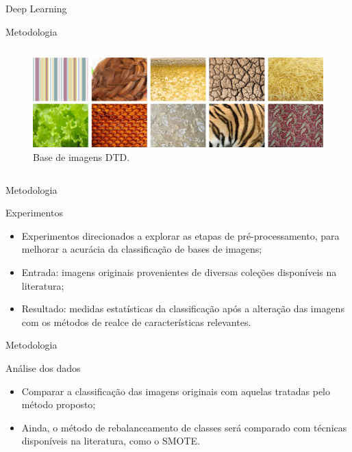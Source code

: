 \documentclass{beamer}
\begin{document}
\begin{frame}{Deep Learning}
\begin{frame}{Metodologia}
\begin{columns}
\begin{column}{0.5\textwidth}
\begin{figure}[hbpt]
      \begin{center}    
        \includegraphics[width=\columnwidth]{figuras/texture.png}
       \end{center}
      \caption{Base de imagens DTD.}
    \end{figure}
  \end{column}
\end{columns}
\end{frame}
\begin{frame}{Metodologia}
\begin{block}{Experimentos}
\justifying
\begin{itemize}
\item Experimentos direcionados a explorar as etapas de pré-processamento, para melhorar a acurácia da classificação de bases de imagens;
\item Entrada: imagens originais provenientes de diversas coleções disponíveis na literatura;
\item Resultado: medidas estatísticas da classificação após a alteração das imagens com os métodos de realce de características relevantes.
\end{itemize}
\end{block}
\end{frame}
\begin{frame}{Metodologia}
\begin{block}{Análise dos dados}
\justifying
\begin{itemize}
\item Comparar a classificação das imagens originais com aquelas tratadas pelo método proposto;
\item Ainda, o método de rebalanceamento de classes será comparado com técnicas disponíveis na literatura, como o SMOTE.
\end{itemize}
\end{block}
\end{frame}

\end{frame}
\end{document}
